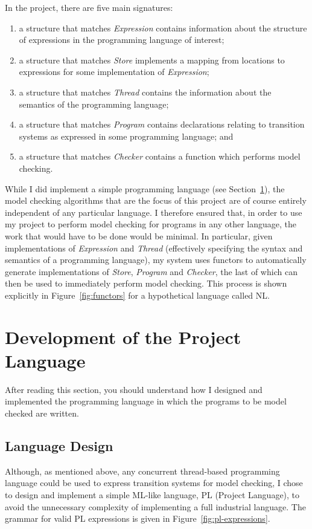 \documentclass[12pt,a4paper,twoside,openright]{report}
\begin{document}
In the project, there are five main signatures:
\begin{enumerate}
	\item a structure that matches \emph{Expression}
	contains information about the structure of expressions
	in the programming language of interest;
	\item a structure that matches \emph{Store}
	implements a mapping from locations
	to expressions for some implementation of \emph{Expression};
	\item a structure that matches \emph{Thread} contains
	the information about the semantics
	of the programming language;
	\item a structure that matches \emph{Program}
	contains declarations relating to
	transition systems as expressed in some programming
	language; and
	\item a structure that matches \emph{Checker}
	contains a function which performs model checking.
\end{enumerate}

While I did implement a simple programming language
(see Section~\ref{sec:language}), the model checking
algorithms that are the focus of this project are of
course entirely independent of any particular language.
I therefore ensured that, in order to use
my project to perform model checking for programs
in any other language, the work that would have to
be done would be minimal. In particular, given implementations
of \emph{Expression} and \emph{Thread} (effectively
specifying the syntax and semantics of a programming
language), my system uses
functors to automatically generate implementations of
\emph{Store}, \emph{Program} and \emph{Checker}, the
last of which can then be used to immediately perform
model checking. This process is shown explicitly in
Figure~\ref{fig:functors} for
a hypothetical language called NL.

\section{Development of the Project Language}
\label{sec:language}
After reading this section, you should
understand how I designed
and implemented the programming
language in which the programs to
be model checked are written.

\subsection{Language Design}
Although, as mentioned above, any concurrent
thread-based programming language
could be used to express transition systems for model
checking, I chose to design and implement a simple
ML-like language, PL (Project Language), to avoid
the unnecessary complexity of implementing a full
industrial language.
The grammar for valid PL expressions is given in
Figure~\ref{fig:pl-expressions}.
\end{document}
